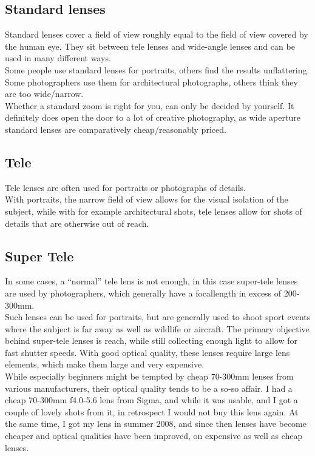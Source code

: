 \subsection{Standard lenses}
Standard lenses cover a field of view roughly equal to the field of view covered by the human eye. They sit between tele lenses and wide-angle lenses and can be used in many different ways.
\\
Some people use standard lenses for portraits, others find the results unflattering. Some photographers use them for architectural photographs, others think they are too wide/narrow.
\\
Whether a standard zoom is right for you, can only be decided by yourself. It definitely does open the door to a lot of creative photography, as wide aperture standard lenses are comparatively cheap/reasonably priced.

\subsection{Tele}
Tele lenses are often used for portraits or photographs of details.
\\
With portraits, the narrow field of view allows for the visual isolation of the subject, while with for example architectural shots, tele lenses allow for shots of details that are otherwise out of reach.

\subsection{Super Tele}
In some cases, a ``normal'' tele lens is not enough, in this case super-tele lenses are used by photographers, which generally have a \gls{focallength} in excess of 200-300mm.
\\
Such lenses can be used for portraits, but are generally used to shoot sport events where the subject is far away as well as wildlife or aircraft. The primary objective behind super-tele lenses is reach, while still collecting enough light to allow for fast shutter speeds. With good optical quality, these lenses require large lens elements, which make them large and very expensive.
\\
While especially beginners might be tempted by cheap 70-300mm lenses from various manufacturers, their optical quality tends to be a so-so affair. I had a cheap 70-300mm f4.0-5.6 lens from Sigma, and while it was usable, and I got a couple of lovely shots from it, in retrospect I would not buy this lens again. At the same time, I got my lens in summer 2008, and since then lenses have become cheaper and optical qualities have been improved, on expensive as well as cheap lenses.

